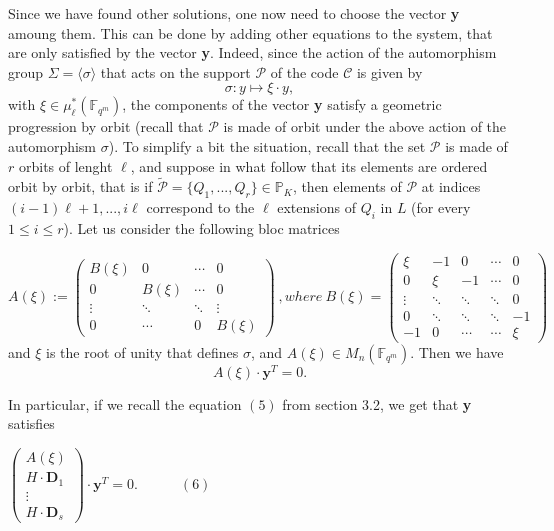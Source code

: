 \documentclass[10pt]{article}
\newcommand{\s}{\vspace{0.3cm}}
\newcommand{\cd}{\cdot}
\newcommand{\fqm}{\mathbb{F}_{q^m}}
\newcommand{\PR}{\mathcal{P}}
\begin{document}
\s

Since we have found other solutions, one now need to choose the vector \textbf{y} amoung them. This can be done by adding other equations to the system, that are only satisfied by the vector \textbf{y}. Indeed, since the action of the automorphism group $\Sigma = \langle\sigma\rangle$ that acts on the support $\PR$ of the code $\mathcal{C}$ is given by 
\[\sigma : y \longmapsto \xi \cd y,\]
with $\xi \in \mu^*_{\ell}(\fqm)$, the components of the vector \textbf{y} satisfy a geometric progression by orbit (recall that $\PR$ is made of orbit under the above action of the automorphism $\sigma$). To simplify a bit the situation, recall that the set $\PR$ is made of $r$ orbits of lenght $\ell$, and suppose in what follow that its elements are ordered orbit by orbit, that is if $\tilde{\PR} = \{Q_1,...,Q_r\} \in \mathbb{P}_K$, then elements of $\PR$ at indices $(i-1)\ell+1,...,i\ell$ correspond to the $\ell$ extensions of $Q_{i}$ in $L$ (for every $1\leq i \leq r$). Let us consider the following bloc matrices

\begin{equation*}
A(\xi) := 
\begin{pmatrix}
B(\xi) & 0 & \cdots & 0 \\
0 & B(\xi) & \cdots & 0 \\
\vdots & \ddots & \ddots & \vdots \\
0 & \cdots & 0 & B(\xi)
\end{pmatrix} \ , where \ 
B(\xi) = 
\begin{pmatrix}
\xi & -1 & 0 & \cdots & 0 \\
0 & \xi & -1 & \cdots & 0 \\
\vdots & \ddots & \ddots & \ddots & 0 \\
0 & \ddots & \ddots & \ddots & -1 \\
-1 & 0 & \cdots & \cdots & \xi
\end{pmatrix}
\end{equation*}
and $\xi$ is the root of unity that defines $\sigma$, and $A(\xi) \in M_{n}(\fqm)$. Then we have
\begin{equation*}
A(\xi) \cd \textbf{y}^T
= 0.
\end{equation*}

In particular, if we recall the equation $(5)$ from section 3.2, we get that \textbf{y} satisfies


\begin{center}
$\begin{pmatrix}
A(\xi) \\
H \cd \textbf{D}_1 \\
\vdots \\
H \cd \textbf{D}_s
\end{pmatrix}
\cd \textbf{y}^T = 0. \quad \quad \quad (6)$
\end{center}
\end{document}
